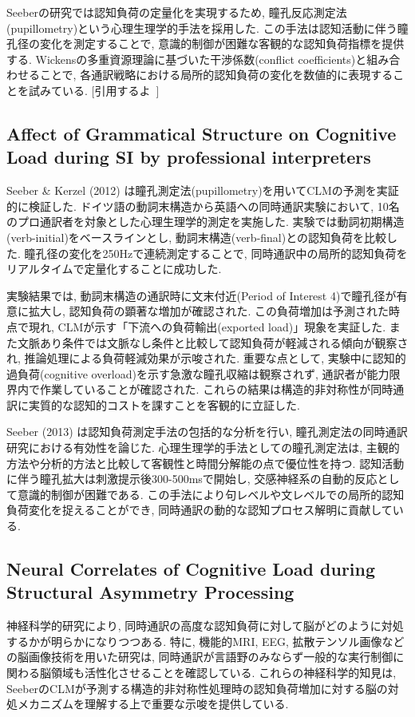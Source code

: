 Seeberの研究では認知負荷の定量化を実現するため, 瞳孔反応測定法(pupillometry)という心理生理学的手法を採用した.
この手法は認知活動に伴う瞳孔径の変化を測定することで, 意識的制御が困難な客観的な認知負荷指標を提供する.
Wickensの多重資源理論に基づいた干渉係数(conflict coefficients)と組み合わせることで, 各通訳戦略における局所的認知負荷の変化を数値的に表現することを試みている.
[引用するよ~]

\subsection{Affect of Grammatical Structure on Cognitive Load during SI by professional interpreters}

Seeber \& Kerzel (2012) \cite{seeber2012cognitive}は瞳孔測定法(pupillometry)を用いてCLMの予測を実証的に検証した.
ドイツ語の動詞末構造から英語への同時通訳実験において, 10名のプロ通訳者を対象とした心理生理学的測定を実施した.
実験では動詞初期構造(verb-initial)をベースラインとし, 動詞末構造(verb-final)との認知負荷を比較した.
瞳孔径の変化を250Hzで連続測定することで, 同時通訳中の局所的認知負荷をリアルタイムで定量化することに成功した.

実験結果では, 動詞末構造の通訳時に文末付近(Period of Interest 4)で瞳孔径が有意に拡大し, 認知負荷の顕著な増加が確認された.
この負荷増加は予測された時点で現れ, CLMが示す「下流への負荷輸出(exported load)」現象を実証した.
また文脈あり条件では文脈なし条件と比較して認知負荷が軽減される傾向が観察され, 推論処理による負荷軽減効果が示唆された.
重要な点として, 実験中に認知的過負荷(cognitive overload)を示す急激な瞳孔収縮は観察されず, 通訳者が能力限界内で作業していることが確認された.
これらの結果は構造的非対称性が同時通訳に実質的な認知的コストを課すことを客観的に立証した.

Seeber (2013) \cite{seeber2013cognitive}は認知負荷測定手法の包括的な分析を行い, 瞳孔測定法の同時通訳研究における有効性を論じた.
心理生理学的手法としての瞳孔測定法は, 主観的方法や分析的方法と比較して客観性と時間分解能の点で優位性を持つ.
認知活動に伴う瞳孔拡大は刺激提示後300-500msで開始し, 交感神経系の自動的反応として意識的制御が困難である.
この手法により句レベルや文レベルでの局所的認知負荷変化を捉えることができ, 同時通訳の動的な認知プロセス解明に貢献している.

\subsection{Neural Correlates of Cognitive Load during Structural Asymmetry Processing}
神経科学的研究により, 同時通訳の高度な認知負荷に対して脳がどのように対処するかが明らかになりつつある. 
特に, 機能的MRI, EEG, 拡散テンソル画像などの脳画像技術を用いた研究は, 同時通訳が言語野のみならず一般的な実行制御に関わる脳領域も活性化させることを確認している.
これらの神経科学的知見は, SeeberのCLMが予測する構造的非対称性処理時の認知負荷増加に対する脳の対処メカニズムを理解する上で重要な示唆を提供している.

